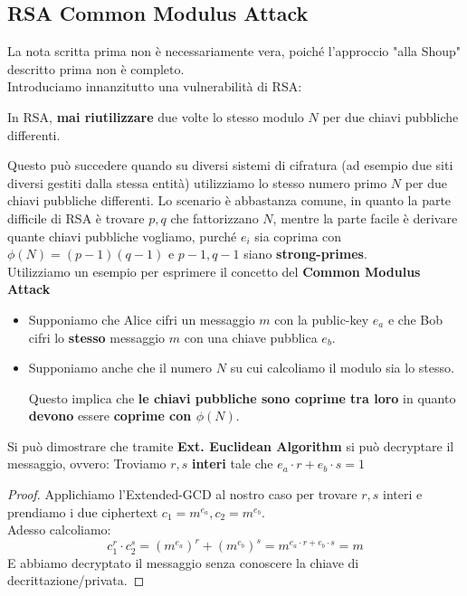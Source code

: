 \subsection{RSA Common Modulus Attack}
La nota scritta prima non è necessariamente vera, poiché l'approccio "alla Shoup" descritto prima non è completo.\\
Introduciamo innanzitutto una vulnerabilità di RSA: 
\begin{proposition}
In RSA, \textbf{mai riutilizzare} due volte lo stesso modulo $N$ per due chiavi pubbliche differenti.
\end{proposition}
Questo può succedere quando su diversi sistemi di cifratura (ad esempio due siti diversi gestiti dalla stessa entità) utilizziamo lo stesso numero primo $N$ per due chiavi pubbliche differenti. Lo scenario è abbastanza comune, in quanto la parte difficile di RSA è trovare $p,q$ che fattorizzano $N$, mentre la parte facile è derivare quante chiavi pubbliche vogliamo, purché $e_i$ sia coprima con $\phi(N)=(p-1)(q-1)$ e $p-1, q-1$ siano \textbf{strong-primes}.\\
Utilizziamo un esempio per esprimere il concetto del \textbf{Common Modulus Attack}
\begin{theorem}\label{thm:rsacomm}
\noindent\begin{itemize}
    \item Supponiamo che Alice cifri un messaggio $m$ con la public-key $e_a$ e che Bob cifri lo \textbf{stesso} messaggio $m$ con una chiave pubblica $e_b$.
    \item Supponiamo anche che il numero $N$ su cui calcoliamo il modulo sia lo stesso.\\
    \begin{remark}
    Questo implica che \textbf{le chiavi pubbliche sono coprime tra loro} in quanto \textbf{devono} essere \textbf{coprime con $\phi(N)$}.  
    \end{remark}
\end{itemize}
Si può dimostrare che tramite \textbf{Ext. Euclidean Algorithm} si può decryptare il messaggio, ovvero: Troviamo $r,s$ \textbf{interi} tale che $e_a\cdot r+e_b\cdot s=1$
\end{theorem}
\begin{proof}
Applichiamo l'Extended-GCD al nostro caso per trovare $r,s$ interi e prendiamo i due ciphertext $c_1=m^{e_a}, c_2=m^{e_b}$.\\
Adesso calcoliamo:
\begin{equation}\label{eq:rsamod}
    c_1^r\cdot c_2^s=(m^{e_a})^r+(m^{e_b})^s=m^{e_a\cdot r+e_b\cdot s}=m
\end{equation}
E abbiamo decryptato il messaggio senza conoscere la chiave di decrittazione/privata.
\end{proof}
